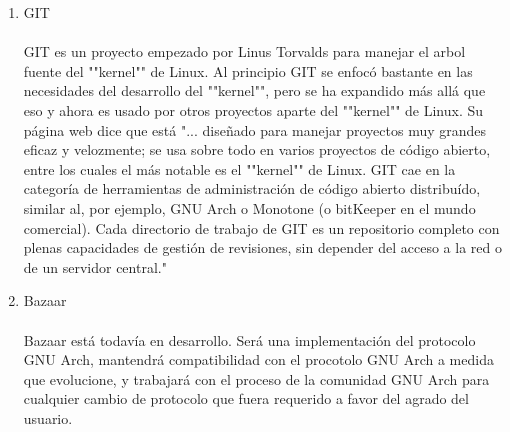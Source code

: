 \begin{enumerate}[1.]
	\item GIT
	\\
	\\GIT es un proyecto empezado por Linus Torvalds para manejar el arbol fuente del ""kernel"" de Linux. Al principio GIT se enfocó bastante en las necesidades del desarrollo del ""kernel"", pero se ha expandido más allá que eso y ahora es usado por otros proyectos aparte del ""kernel"" de Linux. Su página web dice que está "... diseñado para manejar proyectos muy grandes eficaz y velozmente; se usa sobre todo en varios proyectos de código abierto, entre los cuales el más notable es el ""kernel"" de Linux. GIT cae en la categoría de herramientas de administración de código abierto distribuído, similar al, por ejemplo, GNU Arch o Monotone (o bitKeeper en el mundo comercial). Cada directorio de trabajo de GIT es un repositorio completo con plenas capacidades de gestión de revisiones, sin depender del acceso a la red o de un servidor central."

	\item Bazaar
	\\
	\\Bazaar está todavía en desarrollo. Será una implementación del protocolo GNU Arch, mantendrá compatibilidad con el procotolo GNU Arch a medida que evolucione, y trabajará con el proceso de la comunidad GNU Arch para cualquier cambio de protocolo que fuera requerido a favor del agrado del usuario.

\end{enumerate}



